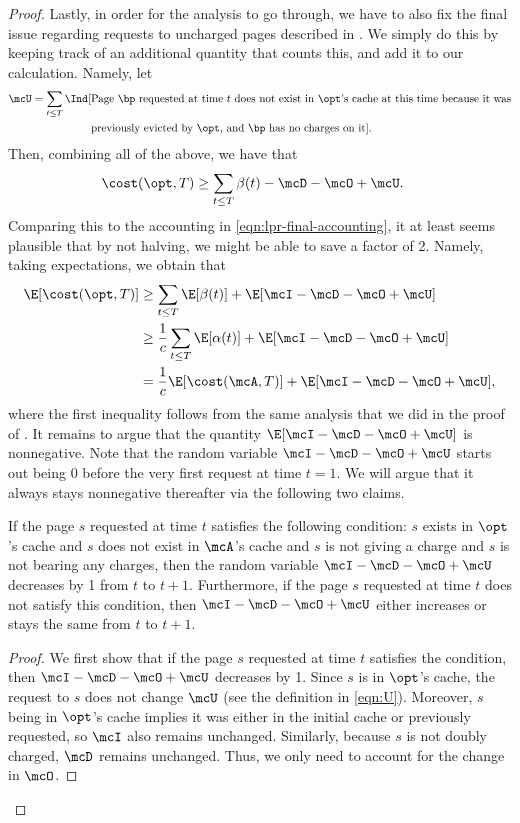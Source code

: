 \documentclass[11pt]{article}
\begin{document}
\begin{proof}
    Lastly, in order for the analysis to go through, we have to also fix the final issue regarding requests to uncharged pages described in . We simply do this by keeping track of an additional quantity that counts this, and add it to our calculation. Namely, let
    \begin{align}
        \mcU = \sum_{t \le T}\Ind[&\text{Page $\bp$ requested at time $t$ does not exist in $\opt$'s cache at this time because it was} \nonumber \\ 
        &\text{previously evicted by $\opt$, and $\bp$ has no charges on it}]. \label{eqn:U}
    \end{align}
    Then, combining all of the above, we have that
    \begin{align}
        \cost(\opt, T) &\ge \sum_{t \le T}\beta(t) - \mcD - \mcO + \mcU. \label{eqn:updated-final-accounting}
    \end{align}
    Comparing this to the accounting in \eqref{eqn:lpr-final-accounting}, it at least seems plausible that by not halving, we might be able to save a factor of 2. Namely, taking expectations, we obtain that
    \begin{align*}
        \E[\cost(\opt, T)] &\ge \sum_{t \le T} \E[\beta(t)] + \E[\mcI - \mcD - \mcO + \mcU] \\
        &\ge \frac{1}{c}\sum_{t \le T}\E[\alpha(t)] + \E[\mcI - \mcD - \mcO + \mcU] \\
        &= \frac{1}{c}\E[\cost(\mcA, T)] + \E[\mcI - \mcD - \mcO + \mcU],
    \end{align*}
    where the first inequality follows from the same analysis that we did in the proof of . It remains to argue that the quantity $\E[\mcI - \mcD - \mcO + \mcU]$ is nonnegative. Note that the random variable $\mcI - \mcD - \mcO + \mcU$ starts out being $0$ before the very first request at time $t=1$. We will argue that it always stays nonnegative thereafter via the following two claims.

    \begin{claim}
        \label{claim:potential-decrease-characterization}
         If the page $s$ requested at time $t$ satisfies the following condition: $s$ exists in $\opt$'s cache and $s$ does not exist in $\mcA$'s cache and $s$ is not giving a charge and $s$ is not bearing any charges, then the random variable $\mcI-\mcD-\mcO+\mcU$ decreases by 1 from $t$ to $t+1$. Furthermore, if the page $s$ requested at time $t$ does not satisfy this condition, then $\mcI-\mcD-\mcO+\mcU$ either increases or stays the same from $t$ to $t+1$.
    \end{claim}
    \begin{proof}
        We first show that if the page $s$ requested at time $t$ satisfies the condition, then $\mcI - \mcD - \mcO + \mcU$ decreases by 1. Since $s$ is in $\opt$'s cache, the request to $s$ does not change $\mcU$ (see the definition in \eqref{eqn:U}). Moreover, $s$ being in $\opt$'s cache implies it was either in the initial cache or previously requested, so $\mcI$ also remains unchanged. Similarly, because $s$ is not doubly charged, $\mcD$ remains unchanged. Thus, we only need to account for the change in $\mcO$.


\end{proof}
\end{proof}
\end{document}

